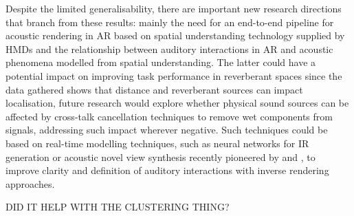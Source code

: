 Despite the limited generalisability, there are important new research directions that branch from these results: mainly the need for an end-to-end pipeline for acoustic rendering in AR based on spatial understanding technology supplied by HMDs and the relationship between auditory interactions in AR and acoustic phenomena modelled from spatial understanding. The latter could have a potential impact on improving task performance in reverberant spaces since the data gathered shows that distance and reverberant sources can impact localisation, future research would explore whether physical sound sources can be affected by cross-talk cancellation techniques to remove wet components from signals, addressing such impact wherever negative. Such techniques could be based on real-time modelling techniques, such as neural networks for IR generation or acoustic novel view synthesis recently pioneered by \cite{ratnarajah2022mesh2ir} and  \cite{chen2023novel}, to improve clarity and definition of auditory interactions with inverse rendering approaches. \par


DID IT HELP WITH THE CLUSTERING THING?

